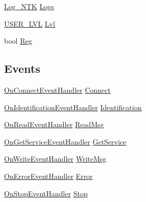 \begin{DoxyCompactItemize}
\item 
\mbox{\hyperlink{class_n_t_k_1_1_other_1_1_log___n_t_k}{Log\+\_\+\+N\+TK}} \mbox{\hyperlink{class_n_t_k_1_1_n_t_k_client_aa64d9ddcb65448b5862429f881bb3b2f}{Logs}}
\item 
\mbox{\hyperlink{namespace_n_t_k_a1a2136a0cde3a719c9188a4d515e9f1b}{U\+S\+E\+R\+\_\+\+L\+VL}} \mbox{\hyperlink{class_n_t_k_1_1_n_t_k_client_a5068e826f2309f9a3e8e85c8e5d2f058}{Lvl}}
\item 
bool \mbox{\hyperlink{class_n_t_k_1_1_n_t_k_client_aa56f80b924cd1fa2035421bec04401dc}{Reg}}
\end{DoxyCompactItemize}
\subsection*{Events}
\begin{DoxyCompactItemize}
\item 
\mbox{\hyperlink{namespace_n_t_k_a8743f7b779ee57a52d3757cd46ea0060}{On\+Connect\+Event\+Handler}} \mbox{\hyperlink{class_n_t_k_1_1_n_t_k_client_a0c60a69d1fa1e8cca122b89b7a44bf7a}{Connect}}
\item 
\mbox{\hyperlink{namespace_n_t_k_a7691450f3d18d3bd04ffaf0a7b564b52}{On\+Identification\+Event\+Handler}} \mbox{\hyperlink{class_n_t_k_1_1_n_t_k_client_ac4c9d101b5c8f191eeb940393618e2a7}{Identification}}
\item 
\mbox{\hyperlink{namespace_n_t_k_a9fd65121d09e11207741ba8765106f70}{On\+Read\+Event\+Handler}} \mbox{\hyperlink{class_n_t_k_1_1_n_t_k_client_ae5ffca32f666369b608d6bbe3f424639}{Read\+Msg}}
\item 
\mbox{\hyperlink{namespace_n_t_k_af8c7a0dee9d2b4d395e6d806229d2d4f}{On\+Get\+Service\+Event\+Handler}} \mbox{\hyperlink{class_n_t_k_1_1_n_t_k_client_a47d345a839278e8ed85ddb7bad21d3aa}{Get\+Service}}
\item 
\mbox{\hyperlink{namespace_n_t_k_a664e2a81c1b642a3270f33d0848ac27e}{On\+Write\+Event\+Handler}} \mbox{\hyperlink{class_n_t_k_1_1_n_t_k_client_a200b044e735eb5123ea71b51abc26fe6}{Write\+Msg}}
\item 
\mbox{\hyperlink{namespace_n_t_k_a41f1f90439f13a48e64026ed730a1df8}{On\+Error\+Event\+Handler}} \mbox{\hyperlink{class_n_t_k_1_1_n_t_k_client_abddf03638d993f877c31c1deeb87430b}{Error}}
\item 
\mbox{\hyperlink{namespace_n_t_k_ac2573df1e8f9ef401f201a96c0333d92}{On\+Stop\+Event\+Handler}} \mbox{\hyperlink{class_n_t_k_1_1_n_t_k_client_a2c88bbcc3876c947aec79af93f213474}{Stop}}
\end{DoxyCompactItemize}


